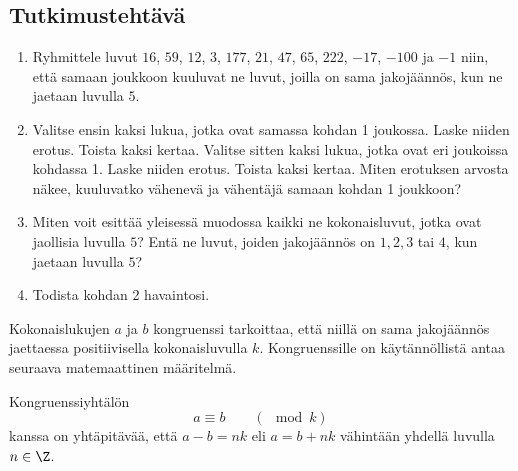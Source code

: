 \subsection*{Tutkimustehtävä}
\begin{enumerate}
\item Ryhmittele luvut $16$, $59$, $12$, $3$, $177$, $21$, $47$, $65$, $222$, $-17$, $-100$ ja $-1$ niin, että samaan joukkoon kuuluvat ne luvut, joilla on sama jakojäännös, kun ne jaetaan luvulla $5$.
\item Valitse ensin kaksi lukua, jotka ovat samassa kohdan 1 joukossa. Laske niiden erotus. Toista kaksi kertaa. Valitse sitten kaksi lukua, jotka ovat eri joukoissa kohdassa 1. Laske niiden erotus. Toista kaksi kertaa. Miten erotuksen arvosta näkee, kuuluvatko vähenevä ja vähentäjä samaan kohdan 1 joukkoon?
\item Miten voit esittää yleisessä muodossa kaikki ne kokonaisluvut, jotka ovat jaollisia luvulla $5$? Entä ne luvut, joiden jakojäännös on $1, 2, 3$ tai $4$, kun jaetaan luvulla $5$?
\item Todista kohdan 2 havaintosi.
\end{enumerate}

Kokonaislukujen $a$ ja $b$ kongruenssi tarkoittaa, että niillä on sama jakojäännös jaettaessa positiivisella kokonaisluvulla $k$. Kongruenssille on käytännöllistä antaa seuraava matemaattinen määritelmä.



Kongruenssiyhtälön
\[
a\equiv b\qquad (\mod k)
\]
kanssa on yhtäpitävää, että $a-b=nk$ eli $a=b+nk$ vähintään yhdellä luvulla $n\in \Z$.


